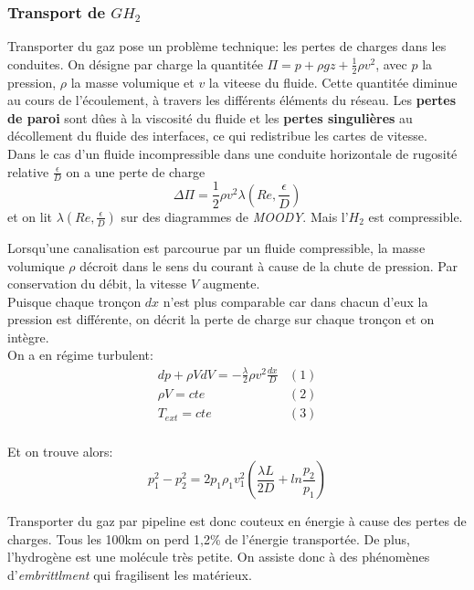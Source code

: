 \documentclass[11pt,french,a4paper]{article}
\begin{document}
\subsubsection{Transport de $GH_2$}

Transporter du gaz pose un problème technique: les pertes de charges dans les conduites. On désigne par charge la quantitée $\Pi = p+\rho g z + \frac{1}{2}\rho v^2$, avec $p$ la pression, $ \rho$ la masse volumique et $v$ la viteese du fluide. Cette quantitée diminue au cours de l'écoulement, à travers les différents éléments du réseau. Les \textbf{pertes de paroi} sont dûes à la viscosité du fluide et les \textbf{pertes singulières} au décollement du fluide des interfaces, ce qui redistribue les cartes de vitesse.\\

Dans le cas d'un fluide incompressible dans une conduite horizontale de rugosité relative $\frac{\epsilon}{D}$ on a une perte de charge $$ \Delta \Pi = \frac{1}{2} \rho v^2 \lambda ( Re, \frac{\epsilon}{D}) $$ et on lit $\lambda ( Re, \frac{\epsilon}{D}) $ sur des diagrammes de \emph{MOODY}. Mais l'$H_2$ est compressible.

Lorsqu'une canalisation est parcourue par un fluide compressible, la masse volumique $\rho$ décroit dans le sens du courant à cause de la chute de pression. Par conservation du débit, la vitesse $V$ augmente. \\ Puisque chaque tronçon $dx$ n'est plus comparable car dans chacun d'eux la pression est différente, on décrit la perte de charge sur chaque tronçon et on intègre. \\
On a en régime turbulent: 
$$
\begin{array}{cc}
 	dp + \rho V dV= -\frac{\lambda}{2}\rho v^2 \frac{dx}{D} & (1) \\
 	\rho V =cte &(2) \\
 	T_{ext}=cte & (3) \\
\end{array}
 $$
 
Et on trouve alors:
$$ p_1^2 - p_2^2 =2 p_1 \rho_1 v_1^2 (\frac{\lambda L}{2 D} + ln\frac{p_2}{p_1}) $$

Transporter du gaz par pipeline est donc couteux en énergie à cause des pertes de charges. Tous les 100km on perd 1,2\% de l'énergie transportée. De plus, l'hydrogène est une molécule très petite. On assiste donc à des phénomènes d'\emph{embrittlment} qui fragilisent les matérieux.
\end{document}
